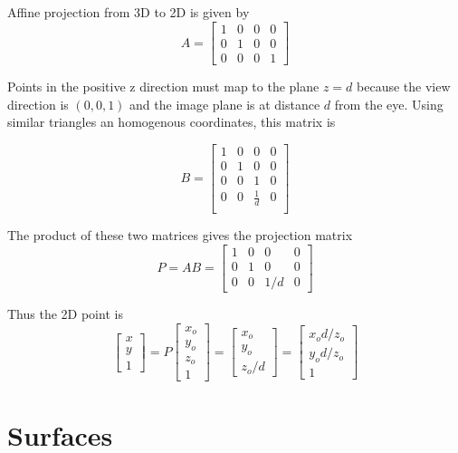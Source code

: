 \documentclass[a4paper,10pt]{scrartcl}
\begin{document}
\subsection{}            

Affine projection from 3D to 2D is given by \[A = \begin{bmatrix} 1 & 0 & 0 & 0 \\ 0 & 1 & 0 & 0 \\ 0 & 0 & 0 & 1 \end{bmatrix}\]

Points in the positive z direction must map to the plane $z = d$ because the view direction is $(0, 0, 1)$ and the image plane is at distance $d$ from the eye.
Using similar triangles an homogenous coordinates, this matrix is

\[ B =\begin{bmatrix}1 & 0 & 0 & 0\\
    0 & 1 & 0 & 0 \\
    0 & 0 & 1 & 0 \\
    0 & 0 & \frac{1}{d} & 0 \\
\end{bmatrix}\]
            
The product of these two matrices gives the projection matrix \[ P = AB = \begin{bmatrix} 1 & 0 & 0 & 0 \\ 0 & 1 & 0 & 0 \\ 0 & 0 & 1/d & 0 \end{bmatrix}\] 

Thus the 2D point is \[ \begin{bmatrix} x \\ y \\ 1\end{bmatrix} = P \begin{bmatrix} x_o \\ y_o \\ z_o \\ 1\end{bmatrix} = \begin{bmatrix} x_o \\ y_o \\ z_o/d\end{bmatrix} = \begin{bmatrix}x_od/z_o \\ y_od/z_o \\ 1\end{bmatrix}\]
        
\section{Surfaces}
\end{document}

